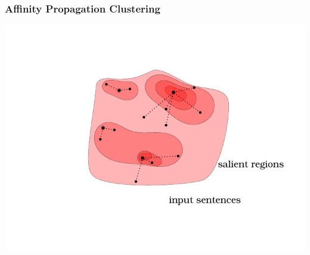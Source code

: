 \documentclass{beamer}
\begin{document}
\begin{frame}
\frametitle{Affinity Propagation Clustering}
    \includegraphics{images/cluster_anim7.pdf}
\end{frame}
\end{document}
